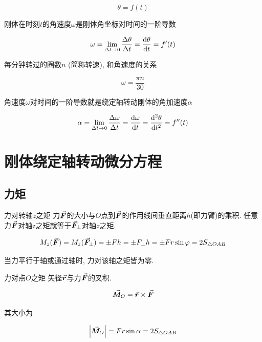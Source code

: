 \begin{equation}
	\theta = f(t) \label{C5-eq1}
\end{equation}

刚体在时刻$t$的角速度$\omega$是刚体角坐标对时间的一阶导数

\begin{equation}
	\omega = \lim\limits_{\Delta t \to 0} \dfrac{\Delta \theta}{\Delta t} = \dv{\theta}{t} = f'(t) \label{C5-eq2}
\end{equation}

每分钟转过的圈数$n$ (简称转速), 和角速度的关系

\begin{equation}
	\omega = \dfrac{\pi n}{30} \label{C5-eq3}
\end{equation}

角速度$\omega$对时间的一阶导数就是绕定轴转动刚体的角加速度$\alpha$

\begin{equation}
	\alpha = \lim\limits_{\Delta t \to 0} \dfrac{\Delta \omega}{\Delta t} = \dv{\omega}{t} = \dv[2]{\theta}{t} = f''(t) \label{C5-eq4}
\end{equation}

\section{刚体绕定轴转动微分方程} \label{5.2}

\subsection{力矩}

\begin{definition}[力矩] \label{C5-df2}
	{\heiti 力对转轴$z$之矩} 力$\va*{F}$的大小与$O$点到$\va*{F}$的作用线间垂直距离$h$(即力臂)的乘积. 任意力$\va*{F}$对轴z之矩就等于$\va*{F}_{\perp}$对轴$z$之矩. 
	
	\begin{equation}
		M_z (\va*{F}) = M_z (\va*{F}_{\perp}) = \pm Fh = \pm F_{\perp} h = \pm Fr\sin \varphi = 2 S_{\triangle OAB} \label{C5-eq5}
	\end{equation}
	
	当力平行于轴或通过轴时, 力对该轴之矩皆为零. 
	
	{\heiti 力对点$O$之矩} 矢径$\va*{r}$与力$\va*{F}$的叉积. 
	
	\begin{equation}
		\va*{M}_O = \va*{r} \times \va*{F} \label{C5-eq6}
	\end{equation}
	
	其大小为
	
	\begin{equation}
		\abs{\va*{M}_O} = Fr\sin \alpha = 2S_{\triangle OAB} \label{C5-eq7}
	\end{equation}
	
\end{definition}

